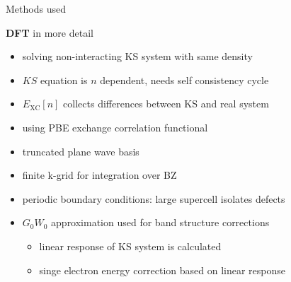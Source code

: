 \documentclass[fontsize=9pt]{beamer}
\begin{document}
\begin{frame}{Methods used}
     {
        \textbf{DFT} in more detail
        \begin{itemize}
            \item solving non-interacting KS system with same density
            \item $KS$ equation is $n$ dependent, needs self consistency cycle
            \item $E_\mathrm{XC}[n]$ collects differences between KS and real system
            \item using PBE exchange correlation functional
            \item truncated plane wave basis
            \item finite k-grid for integration over BZ
            \item periodic boundary conditions: large supercell isolates defects
            \item $G_0 W_0$ approximation used for band structure corrections
            \begin{itemize}
                \item linear response of KS system is calculated
                \item singe electron energy correction based on linear response
            \end{itemize}
        \end{itemize}
    }
\end{frame}
\end{document}
